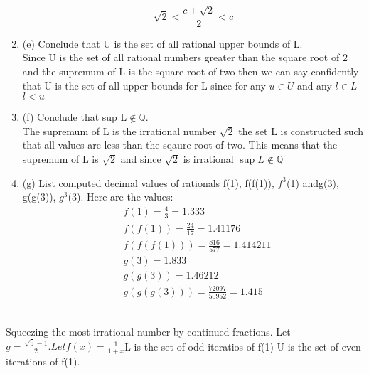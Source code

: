 \documentclass[11pt]{article}
\theoremstyle{definition}  %
\newcommand{\Q}{\mathbb{Q}}
\begin{document}
\begin{enumerate}
  \[
    \sqrt{2}< \frac{c+\sqrt{2}}{2}<c
  \]
  \item (e) Conclude that U is the set of all rational upper bounds of L.\\
  Since U is the set of all rational numbers greater than the square root of 2 and the supremum of L is the square root of two then we can say confidently that U is the set of all upper bounds for L since for any $u \in U$ and any $l \in L $ $l< u $
  \item (f) Conclude that sup L$\notin \Q$.\\
  The supremum of L is the irrational number $\sqrt{2}$ the set L is constructed such that all values are less than the sqaure root of two. This means that the supremum of L is $\sqrt{2}$ and since $\sqrt{2}$ is irrational $\sup L \notin \Q$
  \item (g) List computed decimal values of rationals f(1), f(f(1)), $f^3$(1) andg(3), g(g(3)), $g^3$(3).
  Here are the values:
  \begin{align*}
    &f(1)= \frac{4}{3}=1.333\\
    &f(f(1))=\frac{24}{17}=1.41176\\
    &f(f(f(1)))=\frac{816}{577}=1.414211\\
    &g(3)=1.833\\
    &g(g(3))=1.46212\\
    &g(g(g(3)))=\frac{72097}{50952}=1.415
  \end{align*}

\end{enumerate}
\\
Squeezing the most irrational number by continued fractions. Let $g=\frac{\sqrt{5}-1}{2}. Let f(x)=\frac{1}{1+x}$L is the set of odd iteratios of f(1) U is the set of even iterations of f(1).\\
\end{document}
